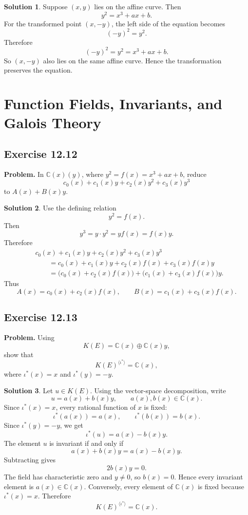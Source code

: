 \documentclass[11pt]{article}
\theoremstyle{definition}
\newtheorem*{solution}{Solution}
\newcommand{\C}{\mathbb{C}}
\newcommand{\K}{K}
\begin{document}
\begin{solution}
Suppose \((x,y)\) lies on the affine curve.  Then
\[
  y^2=x^3+ax+b.
\]
For the transformed point \((x,-y)\), the left side of the equation becomes
\[
  (-y)^2=y^2.
\]
Therefore
\[
  (-y)^2=y^2=x^3+ax+b.
\]
So \((x,-y)\) also lies on the same affine curve.  Hence the transformation
preserves the equation.
\end{solution}

\section{Function Fields, Invariants, and Galois Theory}

\subsection*{Exercise 12.12}
\textbf{Problem.}  In \(\C(x)(y)\), where \(y^2=f(x)=x^3+ax+b\), reduce
\[
  c_0(x)+c_1(x)y+c_2(x)y^2+c_3(x)y^3
\]
to \(A(x)+B(x)y\).

\begin{solution}
Use the defining relation
\[
  y^2=f(x).
\]
Then
\[
  y^3=y\cdot y^2=yf(x)=f(x)y.
\]
Therefore
\[
\begin{aligned}
  &c_0(x)+c_1(x)y+c_2(x)y^2+c_3(x)y^3 \\
  &\qquad
  =
  c_0(x)+c_1(x)y+c_2(x)f(x)+c_3(x)f(x)y\\
  &\qquad
  =
  \bigl(c_0(x)+c_2(x)f(x)\bigr)
  +
  \bigl(c_1(x)+c_3(x)f(x)\bigr)y.
\end{aligned}
\]
Thus
\[
  A(x)=c_0(x)+c_2(x)f(x),
  \qquad
  B(x)=c_1(x)+c_3(x)f(x).
\]
\end{solution}

\subsection*{Exercise 12.13}
\textbf{Problem.}  Using
\[
  \K(E)=\C(x)\oplus \C(x)y,
\]
show that
\[
  \K(E)^{\langle\iota^*\rangle}=\C(x),
\]
where \(\iota^*(x)=x\) and \(\iota^*(y)=-y\).

\begin{solution}
Let \(u\in\K(E)\).  Using the vector-space decomposition, write
\[
  u=a(x)+b(x)y,
  \qquad
  a(x),b(x)\in \C(x).
\]
Since \(\iota^*(x)=x\), every rational function of \(x\) is fixed:
\[
  \iota^*(a(x))=a(x),
  \qquad
  \iota^*(b(x))=b(x).
\]
Since \(\iota^*(y)=-y\), we get
\[
  \iota^*(u)
  =
  a(x)-b(x)y.
\]
The element \(u\) is invariant if and only if
\[
  a(x)+b(x)y=a(x)-b(x)y.
\]
Subtracting gives
\[
  2b(x)y=0.
\]
The field has characteristic zero and \(y\neq 0\), so \(b(x)=0\).  Hence every
invariant element is \(a(x)\in \C(x)\).  Conversely, every element of
\(\C(x)\) is fixed because \(\iota^*(x)=x\).  Therefore
\[
  \K(E)^{\langle\iota^*\rangle}=\C(x).
\]
\end{solution}
\end{document}
